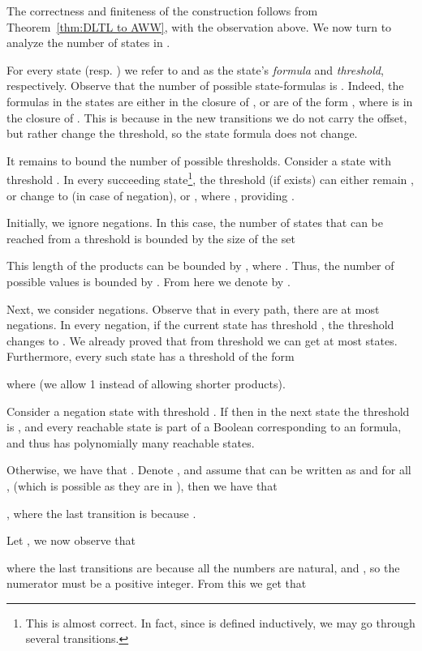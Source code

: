 \documentclass{llncs}
\begin{document}
The correctness and finiteness of the construction follows from Theorem~\ref{thm:DLTL to AWW}, with the observation above. We now turn to analyze the number of states in .

For every state  (resp. ) we refer to  and  as the state's {\em formula} and {\em threshold}, respectively. Observe that the number of possible state-formulas is .
Indeed, the formulas in the states are either in the closure of , or are of the form , where  is in the closure of . This is because in the new transitions we do not carry the offset, but rather change the threshold, so the state formula does not change.

It remains to bound the number of possible thresholds.
Consider a state with threshold . In every succeeding state\footnote{This is almost correct. In fact, since  is defined inductively, we may go through several transitions.}, the threshold (if exists) can either remain , or change to  (in case of negation), or , where , providing .

Initially, we ignore negations. In this case, the number of states that can be reached from a threshold  is bounded by the size of the set

This length of the products can be bounded by , where . Thus, the number of possible values is bounded by .
From here we denote  by .

Next, we consider negations. Observe that in every path, there are at most  negations. In every negation, if the current state has threshold , the threshold changes to . We already proved that from threshold  we can get at most  states. Furthermore, every such state has a threshold of the form

where  (we allow 1 instead of allowing shorter products).

Consider a negation state with threshold . If  then in the next state the threshold is , and every reachable state is part of a Boolean  corresponding to an  formula, and thus has polynomially many reachable states.

Otherwise, we have that . Denote , and assume that  can be written as  and for all ,  (which is possible as they are in ), then we have that

 ,
where the last transition is because .

Let , we now observe that


where the last transitions are because all the numbers are natural, and , so the numerator must be a positive integer.
From this we get that
\end{document}
